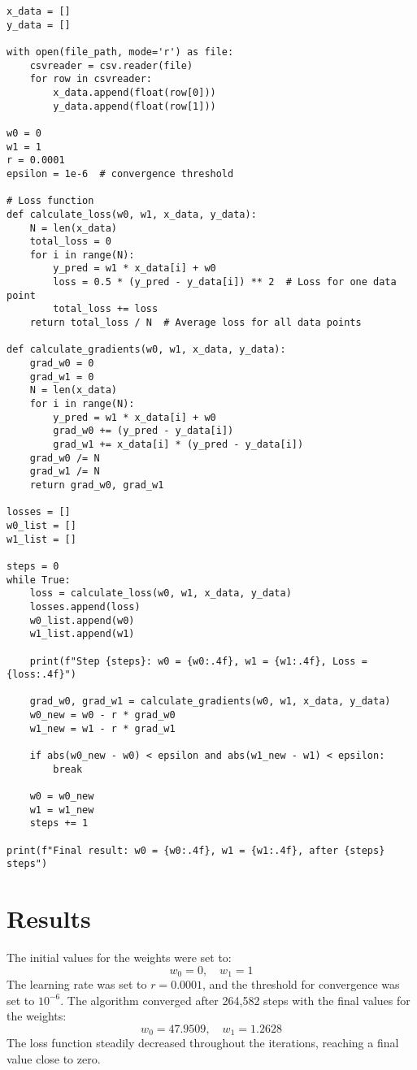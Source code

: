 \documentclass[hidelinks]{report}
\begin{document}
\begin{verbatim}
x_data = []
y_data = []

with open(file_path, mode='r') as file:
    csvreader = csv.reader(file)
    for row in csvreader:
        x_data.append(float(row[0]))  
        y_data.append(float(row[1])) 

w0 = 0  
w1 = 1
r = 0.0001 
epsilon = 1e-6  # convergence threshold

# Loss function
def calculate_loss(w0, w1, x_data, y_data):
    N = len(x_data)
    total_loss = 0
    for i in range(N):
        y_pred = w1 * x_data[i] + w0
        loss = 0.5 * (y_pred - y_data[i]) ** 2  # Loss for one data point
        total_loss += loss
    return total_loss / N  # Average loss for all data points

def calculate_gradients(w0, w1, x_data, y_data):
    grad_w0 = 0
    grad_w1 = 0
    N = len(x_data)
    for i in range(N):
        y_pred = w1 * x_data[i] + w0
        grad_w0 += (y_pred - y_data[i])
        grad_w1 += x_data[i] * (y_pred - y_data[i])
    grad_w0 /= N
    grad_w1 /= N
    return grad_w0, grad_w1

losses = []
w0_list = []
w1_list = []

steps = 0
while True:
    loss = calculate_loss(w0, w1, x_data, y_data)
    losses.append(loss)
    w0_list.append(w0)
    w1_list.append(w1)

    print(f"Step {steps}: w0 = {w0:.4f}, w1 = {w1:.4f}, Loss = {loss:.4f}")

    grad_w0, grad_w1 = calculate_gradients(w0, w1, x_data, y_data)
    w0_new = w0 - r * grad_w0
    w1_new = w1 - r * grad_w1

    if abs(w0_new - w0) < epsilon and abs(w1_new - w1) < epsilon:
        break

    w0 = w0_new
    w1 = w1_new
    steps += 1

print(f"Final result: w0 = {w0:.4f}, w1 = {w1:.4f}, after {steps} steps")
\end{verbatim}

\section{Results}
The initial values for the weights were set to:
\[
w_0 = 0, \quad w_1 = 1
\]
The learning rate was set to \(r = 0.0001\), and the threshold for convergence was set to \(10^{-6}\). The algorithm converged after 264,582 steps with the final values for the weights:
\[
w_0 = 47.9509, \quad w_1 = 1.2628
\]
The loss function steadily decreased throughout the iterations, reaching a final value close to zero.
\end{document}

